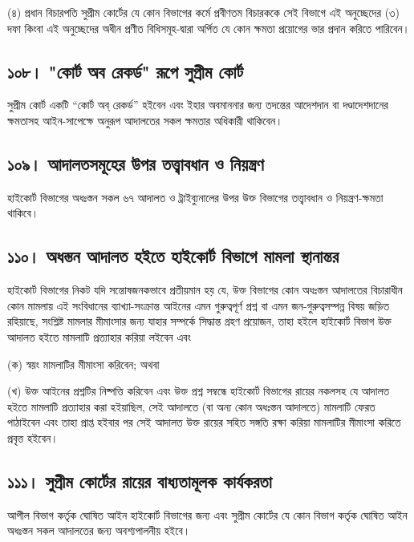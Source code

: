 \documentclass[11pt]{article}
\begin{document}
(৪) প্রধান বিচারপতি সুপ্রীম কোর্টের যে কোন বিভাগের কর্মে প্রবীণতম বিচারককে
    সেই বিভাগে এই অনুচ্ছেদের (৩) দফা কিংবা এই অনুচ্ছেদের অধীন প্রণীত
    বিধিসমূহ-দ্বারা অর্পিত যে কোন ক্ষমতা প্রয়োগের ভার প্রদান করিতে পারিবেন।

\subsection{১০৮। "কোর্ট অব রেকর্ড" রূপে সুপ্রীম কোর্ট}
\label{sec:orgc0556fa}
সুপ্রীম কোর্ট একটি “কোর্ট অব্ রেকর্ড” হইবেন এবং ইহার অবমাননার জন্য তদন্তের
আদেশদান বা দণ্ডাদেশদানের ক্ষমতাসহ আইন-সাপেক্ষে অনুরূপ আদালতের সকল ক্ষমতার
অধিকারী থাকিবেন।

\subsection{১০৯। আদালতসমূহের উপর তত্ত্বাবধান ও নিয়ন্ত্রণ}
\label{sec:org9e63a56}
হাইকোর্ট বিভাগের অধঃস্তন সকল ৬৭ আদালত ও ট্রাইব্যুনালের উপর উক্ত বিভাগের
তত্ত্বাবধান ও নিয়ন্ত্রণ-ক্ষমতা থাকিবে।

\subsection{১১০। অধস্তন আদালত হইতে হাইকোর্ট বিভাগে মামলা স্থানান্তর}
\label{sec:org8595ce8}
হাইকোর্ট বিভাগের নিকট যদি সন্তোষজনকভাবে প্রতীয়মান হয় যে, উক্ত বিভাগের কোন
অধঃস্তন আদালতের বিচারাধীন কোন মামলায় এই সংবিধানের ব্যাখ্যা-সংক্রান্ত আইনের
এমন গুরুত্বপূর্ণ প্রশ্ন বা এমন জন-গুরুত্বসম্পন্ন বিষয় জড়িত রহিয়াছে, সংশ্লিষ্ট
মামলার মীমাংসার জন্য যাহার সম্পর্কে সিদ্ধান্ত গ্রহণ প্রয়োজন, তাহা হইলে
হাইকোর্ট বিভাগ উক্ত আদালত হইতে মামলাটি প্রত্যাহার করিয়া লইবেন এবং

(ক) স্বয়ং মামলাটির মীমাংসা করিবেন; অথবা

(খ) উক্ত আইনের প্রশ্নটির নিষ্পত্তি করিবেন এবং উক্ত প্রশ্ন সম্বন্ধে হাইকোর্ট
    বিভাগের রায়ের নকলসহ যে আদালত হইতে মামলাটি প্রত্যাহার করা হইয়াছিল, সেই
    আদালতে (বা অন্য কোন অধঃস্তন আদালতে) মামলাটি ফেরত পাঠাইবেন এবং তাহা প্রাপ্ত
    হইবার পর সেই আদালত উক্ত রায়ের সহিত সঙ্গতি রক্ষা করিয়া মামলাটির মীমাংসা
    করিতে প্রবৃত্ত হইবেন।

\subsection{১১১। সুপ্রীম কোর্টের রায়ের বাধ্যতামূলক কার্যকরতা}
\label{sec:org5d34dbb}
আপীল বিভাগ কর্তৃক ঘোষিত আইন হাইকোর্ট বিভাগের জন্য এবং সুপ্রীম কোর্টের যে কোন
বিভাগ কর্তৃক ঘোষিত আইন অধঃস্তন সকল আদালতের জন্য অবশ্যপালনীয় হইবে।
\end{document}
